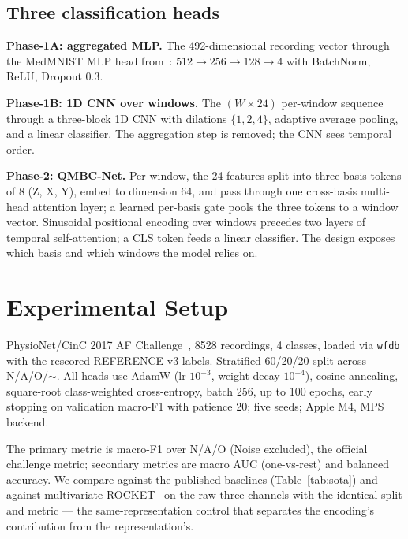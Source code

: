 \documentclass[conference,compsoc]{IEEEtran}
\begin{document}
\subsection{Three classification heads}

\textbf{Phase-1A: aggregated MLP.} The 492-dimensional recording vector through the MedMNIST MLP head from~\cite{atadana2026qpie}: $512\to256\to128\to4$ with BatchNorm, ReLU, Dropout 0.3.

\textbf{Phase-1B: 1D CNN over windows.} The $(W\times 24)$ per-window sequence through a three-block 1D CNN with dilations $\{1,2,4\}$, adaptive average pooling, and a linear classifier. The aggregation step is removed; the CNN sees temporal order.

\textbf{Phase-2: QMBC-Net.} Per window, the 24 features split into three basis tokens of 8 (Z, X, Y), embed to dimension 64, and pass through one cross-basis multi-head attention layer; a learned per-basis gate pools the three tokens to a window vector. Sinusoidal positional encoding over windows precedes two layers of temporal self-attention; a CLS token feeds a linear classifier. The design exposes which basis and which windows the model relies on.

\section{Experimental Setup}
\label{sec:experiments}

PhysioNet/CinC 2017 AF Challenge~\cite{clifford2017af}, 8528 recordings, 4 classes, loaded via \texttt{wfdb} with the rescored REFERENCE-v3 labels. Stratified 60/20/20 split across N/A/O/$\sim$. All heads use AdamW (lr $10^{-3}$, weight decay $10^{-4}$), cosine annealing, square-root class-weighted cross-entropy, batch 256, up to 100 epochs, early stopping on validation macro-F1 with patience 20; five seeds; Apple M4, MPS backend.

The primary metric is macro-F1 over N/A/O (Noise excluded), the official challenge metric; secondary metrics are macro AUC (one-vs-rest) and balanced accuracy. We compare against the published baselines (Table~\ref{tab:sota}) and against multivariate ROCKET~\cite{dempster2020rocket} on the raw three channels with the identical split and metric --- the same-representation control that separates the encoding's contribution from the representation's.

\end{document}
